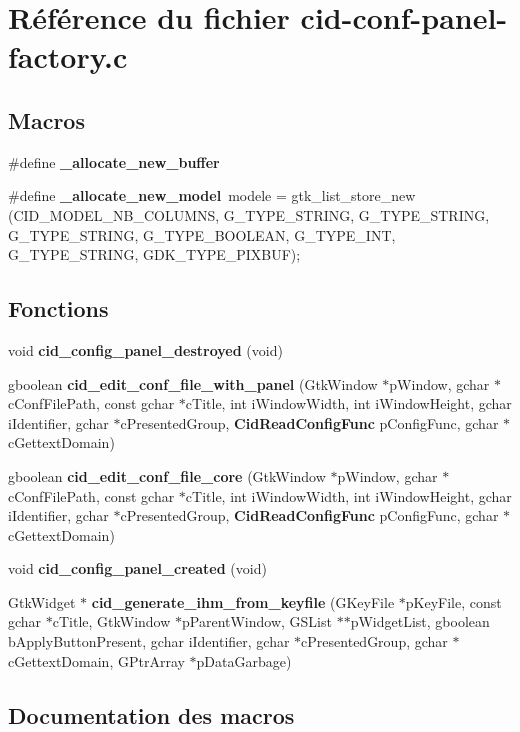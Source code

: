 \section{Référence du fichier cid-conf-panel-factory.c}
\label{cid-conf-panel-factory_8c}
\subsection*{Macros}
\begin{CompactItemize}
\item 
\#define {\bf \_\-allocate\_\-new\_\-buffer}
\item 
\#define {\bf \_\-allocate\_\-new\_\-model}~modele = gtk\_\-list\_\-store\_\-new (CID\_\-MODEL\_\-NB\_\-COLUMNS, G\_\-TYPE\_\-STRING, G\_\-TYPE\_\-STRING, G\_\-TYPE\_\-STRING, G\_\-TYPE\_\-BOOLEAN, G\_\-TYPE\_\-INT, G\_\-TYPE\_\-STRING, GDK\_\-TYPE\_\-PIXBUF);
\end{CompactItemize}
\subsection*{Fonctions}
\begin{CompactItemize}
\item 
void {\bf cid\_\-config\_\-panel\_\-destroyed} (void)
\item 
gboolean {\bf cid\_\-edit\_\-conf\_\-file\_\-with\_\-panel} (GtkWindow $\ast$pWindow, gchar $\ast$cConfFilePath, const gchar $\ast$cTitle, int iWindowWidth, int iWindowHeight, gchar iIdentifier, gchar $\ast$cPresentedGroup, {\bf CidReadConfigFunc} pConfigFunc, gchar $\ast$cGettextDomain)
\item 
gboolean {\bf cid\_\-edit\_\-conf\_\-file\_\-core} (GtkWindow $\ast$pWindow, gchar $\ast$cConfFilePath, const gchar $\ast$cTitle, int iWindowWidth, int iWindowHeight, gchar iIdentifier, gchar $\ast$cPresentedGroup, {\bf CidReadConfigFunc} pConfigFunc, gchar $\ast$cGettextDomain)
\item 
void {\bf cid\_\-config\_\-panel\_\-created} (void)
\item 
GtkWidget $\ast$ {\bf cid\_\-generate\_\-ihm\_\-from\_\-keyfile} (GKeyFile $\ast$pKeyFile, const gchar $\ast$cTitle, GtkWindow $\ast$pParentWindow, GSList $\ast$$\ast$pWidgetList, gboolean bApplyButtonPresent, gchar iIdentifier, gchar $\ast$cPresentedGroup, gchar $\ast$cGettextDomain, GPtrArray $\ast$pDataGarbage)
\end{CompactItemize}


\subsection{Documentation des macros}
